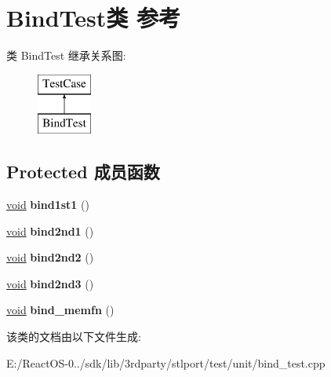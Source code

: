 \hypertarget{class_bind_test}{}\section{Bind\+Test类 参考}
\label{class_bind_test}
类 Bind\+Test 继承关系图\+:\begin{figure}[H]
\begin{center}
\leavevmode
\includegraphics[height=2.000000cm]{class_bind_test}
\end{center}
\end{figure}
\subsection*{Protected 成员函数}
\begin{DoxyCompactItemize}
\item 
\mbox{\label{class_bind_test_a84ffb4ecb062fb42e7355f611b3ac1fa}} 
\hyperlink{interfacevoid}{void} {\bfseries bind1st1} ()
\item 
\mbox{\label{class_bind_test_a05d177686103a561423891ed536c859f}} 
\hyperlink{interfacevoid}{void} {\bfseries bind2nd1} ()
\item 
\mbox{\label{class_bind_test_a3a1827c0d0d7eae232f24696beb690b3}} 
\hyperlink{interfacevoid}{void} {\bfseries bind2nd2} ()
\item 
\mbox{\label{class_bind_test_a39b148518fdef4db2a0e0e13deaccecf}} 
\hyperlink{interfacevoid}{void} {\bfseries bind2nd3} ()
\item 
\mbox{\label{class_bind_test_a97d1f1d6b128ac5b99d4ce474f4b7f59}} 
\hyperlink{interfacevoid}{void} {\bfseries bind\+\_\+memfn} ()
\end{DoxyCompactItemize}


该类的文档由以下文件生成\+:\begin{DoxyCompactItemize}
\item 
E\+:/\+React\+O\+S-\/0../sdk/lib/3rdparty/stlport/test/unit/bind\+\_\+test.\+cpp\end{DoxyCompactItemize}
